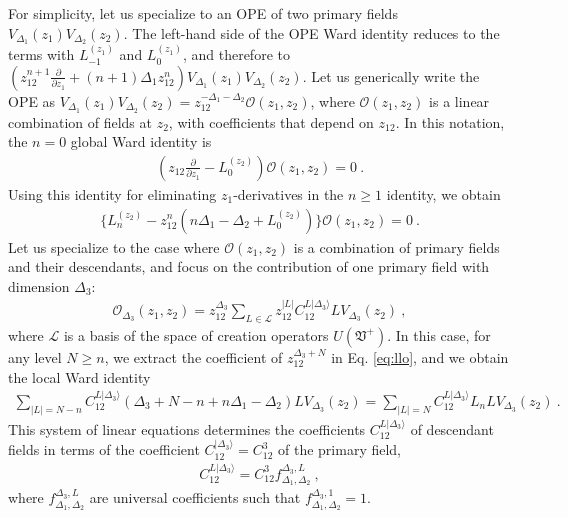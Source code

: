 \documentclass[12pt, a4paper, notitlepage, twoside]{report}
\numberwithin{equation}{section}
\theoremstyle{break}
\begin{document}
For simplicity, let us specialize to an OPE of two primary fields $V_{\Delta_1}(z_1)V_{\Delta_2}(z_2)$. 
The left-hand side of the OPE Ward identity reduces to the terms with $L_{-1}^{(z_1)}$ and $L_0^{(z_1)}$, and therefore to $\left(z_{12}^{n+1}\frac{\partial}{\partial z_1} + (n+1)\Delta_1z_{12}^n\right) V_{\Delta_1}(z_1)V_{\Delta_2}(z_2)$. 
Let us generically write the OPE as $V_{\Delta_1}(z_1)V_{\Delta_2}(z_2) = z_{12}^{-\Delta_1-\Delta_2}\mathcal{O}(z_1,z_2)$, where $\mathcal{O}(z_1,z_2)$ is a linear combination of fields at $z_2$, with coefficients that depend on $z_{12}$. In this notation, the $n=0$ global Ward identity is 
\begin{align}
 \left(z_{12}\frac{\partial}{\partial z_1} - L_0^{(z_2)}\right) \mathcal{O}(z_1,z_2) = 0 \ .
\end{align}
Using this identity for eliminating $z_1$-derivatives in the $n\geq 1$ identity, we obtain
\begin{align}
 \Bigg\{ L_n^{(z_2)} - z_{12}^n \left( n\Delta_1-\Delta_2+L_0^{(z_2)}\right)\Bigg\} \mathcal{O}(z_1,z_2) = 0 \ .
 \label{eq:llo}
\end{align}
Let us specialize to the case where $\mathcal{O}(z_1,z_2)$ is a combination of primary fields and their descendants, and focus on the contribution of one primary field with dimension $\Delta_3$:
\begin{align}
 \mathcal{O}_{\Delta_3}(z_1,z_2) = z_{12}^{\Delta_3}\sum_{L\in\mathcal{L}} z_{12}^{|L|} C^{L|\Delta_3\rangle}_{12} LV_{\Delta_3}(z_2)\ , 
\end{align}
where $\mathcal{L}$ is a basis of the space of creation operators $U(\mathfrak{V}^+)$.
In this case, for any level $N\geq n$, we extract the coefficient of $z_{12}^{\Delta_3+N}$ in Eq. \eqref{eq:llo}, and we obtain the local Ward identity
\begin{align}
 \sum_{|L|=N-n} C^{L|\Delta_3\rangle}_{12}(\Delta_3+N-n+n\Delta_1-\Delta_2)L V_{\Delta_3}(z_2)
 = 
 \sum_{|L|=N} C^{L|\Delta_3\rangle}_{12}L_nL V_{\Delta_3}(z_2)\ .
 \label{eq:lwo}
\end{align}
This system of linear equations determines the coefficients $C^{L|\Delta_3\rangle}_{12}$ of descendant fields in terms of the coefficient $C^{|\Delta_3\rangle}_{12}=C^3_{12}$ of the primary field,
\begin{align}
 C^{L|\Delta_3\rangle}_{12} 
 = 
 C^{3}_{12} f^{\Delta_3,L}_{\Delta_1,\Delta_2}\ ,
\end{align}
where  $f^{\Delta_3,L}_{\Delta_1,\Delta_2}$ are universal coefficients such that $f^{\Delta_3,1}_{\Delta_1,\Delta_2} =1$.
\end{document}

